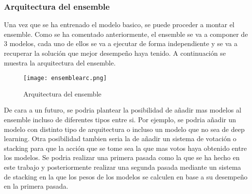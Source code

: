 \subsubsection{Arquitectura del ensemble}
Una vez que se ha entrenado el modelo basico, se puede proceder a montar el ensemble.
Como se ha comentado anteriormente, el ensemble se va a componer de 3 modelos, cada uno
de ellos se va a ejecutar de forma independiente y se va a recuperar la solución que 
mejor desempeño haya tenido. A continuación se muestra la arquitectura del ensemble.

\begin{figure}[ht]
    \centering
    \texttt{[image: ensemblearc.png]}
    \caption{Arquitectura del ensemble}
    \label{fig:ensemblearc}
\end{figure} 

De cara a un futuro, se podria plantear la posibilidad de añadir mas modelos al ensemble
incluso de diferentes tipos entre si. Por ejemplo, se podria añadir un modelo con 
distinto tipo de arquitectura o incluso un modelo que no sea de deep learning. Otra 
posibilidad tambien seria la de añadir un sistema de votación o stacking para que 
la acción que se tome sea la que mas votos haya obtenido entre los modelos. Se
podria realizar una primera pasada como la que se ha hecho en este trabajo y posteriormente
realizar una segunda pasada mediante un sistema de stacking en la que los pesos de los
modelos se calculen en base a su desempeño en la primera pasada.